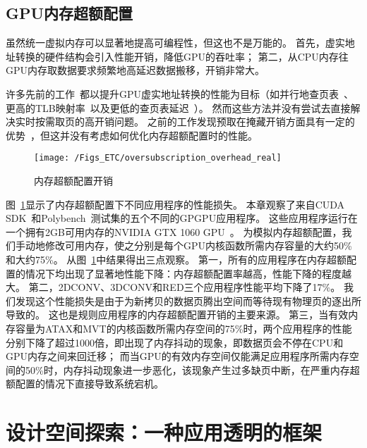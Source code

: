 \subsection{GPU内存超额配置}
虽然统一虚拟内存可以显著地提高可编程性，但这也不是万能的。
首先，虚实地址转换的硬件结构会引入性能开销，降低GPU的吞吐率；
第二，从CPU内存往GPU内存取数据要求频繁地高延迟数据搬移，开销非常大。

许多先前的工作~都以提升GPU虚实地址转换的性能为目标（如并行地查页表~、更高的TLB映射率~以及更低的查页表延迟~）。 
然而这些方法并没有尝试去直接解决实时按需取页的高开销问题。
之前的工作发现预取在掩藏开销方面具有一定的优势~，但这并没有考虑如何优化内存超额配置时的性能。

\begin{figure}[htbp] %
  \centering
  \texttt{[image: /Figs\_ETC/oversubscription\_overhead\_real]}
  \caption{内存超额配置开销}
  \label{fig:oversubscription}
\end{figure}


图~\ref{fig:oversubscription}显示了内存超额配置下不同应用程序的性能损失。
本章观察了来自CUDA SDK~和Polybench~测试集的五个不同的GPGPU应用程序。
这些应用程序运行在一个拥有2GB可用内存的NVIDIA GTX 1060 GPU~。
为模拟内存超额配置，我们手动地修改可用内存，使之分别是每个GPU内核函数所需内存容量的大约50\%和大约75\%。
从图~\ref{fig:oversubscription}中结果得出三点观察。
第一，所有的应用程序在内存超额配置的情况下均出现了显著地性能下降：内存超额配置率越高，性能下降的程度越大。
第二，2DCONV、3DCONV和RED三个应用程序性能平均下降了17\%。
我们发现这个性能损失是由于为新拷贝的数据页腾出空间而等待现有物理页的逐出所导致的。
这也是规则应用程序的内存超额配置开销的主要来源。
第三，当有效内存容量为ATAX和MVT的内核函数所需内存空间的75\%时，两个应用程序的性能分别下降了超过1000倍，即出现了内存抖动的现象，即数据页会不停在CPU和GPU内存之间来回迁移；
而当GPU的有效内存空间仅能满足应用程序所需内存空间的50\%时，内存抖动现象进一步恶化，该现象产生过多缺页中断，在严重内存超额配置的情况下直接导致系统宕机。


\section{设计空间探索：一种应用透明的框架}
\label{sec:etcexplore}

